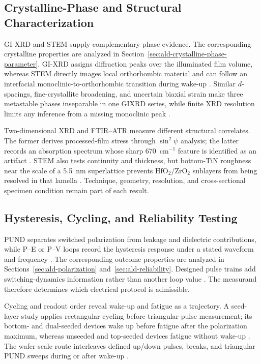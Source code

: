 \documentclass[11pt,a4paper]{report}
\begin{document}
\subsection{Crystalline-Phase and Structural Characterization}
\label{sec:ald-crystalline-characterization}

GI-XRD and STEM supply complementary phase evidence. The corresponding crystalline properties are analyzed in Section~\ref{sec:ald-crystalline-phase-parameter}. GI-XRD assigns diffraction peaks over the illuminated film volume, whereas STEM directly images local orthorhombic material and can follow an interfacial monoclinic-to-orthorhombic transition during wake-up \cite{song2021ferro}. Similar $d$-spacings, fine-crystallite broadening, and uncertain biaxial strain make three metastable phases inseparable in one GIXRD series, while finite XRD resolution limits any inference from a missing monoclinic peak \cite{choi2025purge,kashir2021wake}.

Two-dimensional XRD and FTIR--ATR measure different structural correlates. The former derives processed-film stress through $\sin^2\psi$ analysis; the latter records an absorption spectrum whose sharp 670~cm$^{-1}$ feature is identified as an artifact \cite{choi2025purge}. STEM also tests continuity and thickness, but bottom-TiN roughness near the scale of a 5.5~nm superlattice prevents HfO$_2$/ZrO$_2$ sublayers from being resolved in that lamella \cite{kaatranen2026unif}. Technique, geometry, resolution, and cross-sectional specimen condition remain part of each result.

\subsection{Hysteresis, Cycling, and Reliability Testing}
\label{sec:ald-hysteresis-reliability-testing}

PUND separates switched polarization from leakage and dielectric contributions, while P--E or P--V loops record the hysteresis response under a stated waveform and frequency \cite{song2021ferro,silva2023road,kim2020tin}. The corresponding outcome properties are analyzed in Sections~\ref{sec:ald-polarization} and~\ref{sec:ald-reliability}. Designed pulse trains add switching-dynamics information rather than another loop value \cite{liu2025zrrich}. The measurand therefore determines which electrical protocol is admissible.

Cycling and readout order reveal wake-up and fatigue as a trajectory. A seed-layer study applies rectangular cycling before triangular-pulse measurement; its bottom- and dual-seeded devices wake up before fatigue after the polarization maximum, whereas unseeded and top-seeded devices fatigue without wake-up \cite{song2023seed}. The wafer-scale route interleaves defined up/down pulses, breaks, and triangular PUND sweeps during or after wake-up \cite{kaatranen2026unif}.
\end{document}

